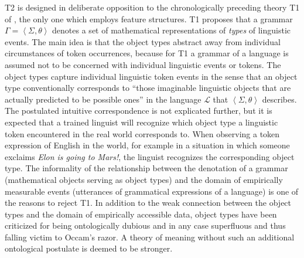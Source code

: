 \documentclass[output=paper
                ,modfonts
                ,nonflat
	        ,collection
	        ,collectionchapter
	        ,collectiontoclongg
 	        ,biblatex
                ,babelshorthands
                ,newtxmath
                ,draftmode
                ,colorlinks, citecolor=brown
]{./langsci/langscibook}
\begin{document}
{{T2 is designed in deliberate opposition to the chronologically
preceding theory T1 of \citet{PollardSag1994}, the only one which
employs feature structures. T1 proposes that a grammar $\Gamma=\left<
\Sigma, \theta\right>$ denotes a set of mathematical representations
of \emph{types} of linguistic events. The main idea is that the object
types abstract away from individual circumstances of token
occurrences, because for T1 a grammar of a language is assumed not to
be concerned with individual linguistic events or tokens.  The object
types capture individual linguistic token events in the sense that an
object type conventionally corresponds to ``those imaginable linguistic
objects that are actually predicted to be possible ones''
\citep[7]{PollardSag1994} in
the language $\mathcal{L}$ that $\left< \Sigma, \theta\right>$
describes.  The postulated intuitive correspondence is not explicated
further, but it is expected that a trained linguist will recognize
which object type a linguistic token encountered in the real world
corresponds to. When observing a token expression of English in the
world, for example in a situation in which someone exclaims \emph{Elon
  is going to Mars!}, the linguist recognizes the corresponding object
type. The informality of the relationship between the denotation of a
grammar (mathematical objects serving as object types) and the domain
of empirically measurable events (utterances of grammatical expressions
of a language) is one of the reasons to reject T1.  In addition to the
weak connection between the object types and the domain of empirically
accessible data, object types have been criticized for being
ontologically dubious and in any case superfluous and thus falling victim
to Occam's razor. A theory of meaning without such an additional
ontological postulate is deemed to be stronger.



}}
\end{document}
